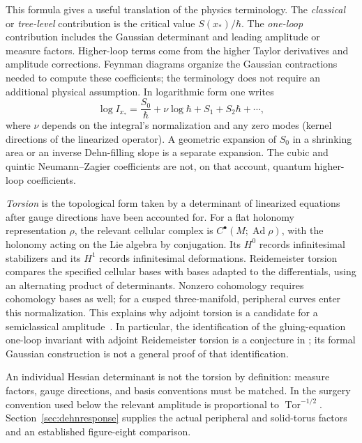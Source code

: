 This formula gives a useful translation of the physics terminology.
The \emph{classical} or \emph{tree-level} contribution is the
critical value $S(x_*)/\hbar$. The \emph{one-loop} contribution
includes the Gaussian determinant and leading amplitude or measure
factors. Higher-loop terms come from the higher Taylor derivatives
and amplitude corrections. Feynman diagrams organize the Gaussian
contractions needed to compute these coefficients; the terminology
does not require an additional physical assumption. In logarithmic
form one writes
\[
 \log I_{x_*}=\frac{S_0}{\hbar}
      +\nu\log\hbar+S_1+S_2\hbar+\cdots,
\]
where $\nu$ depends on the integral's normalization and any zero
modes (kernel directions of the linearized operator). A geometric expansion of $S_0$ in a shrinking area or an
inverse Dehn-filling slope is a separate expansion. The cubic and
quintic Neumann--Zagier coefficients are not, on that account,
quantum higher-loop coefficients.

\emph{Torsion} is the topological form taken by a determinant of
linearized equations after gauge directions have been accounted
for. For a flat holonomy representation $\rho$, the relevant
cellular complex is $C^\bullet(M;\operatorname{Ad}\rho)$, with the
holonomy acting on the Lie algebra by conjugation.
Its $H^0$ records infinitesimal stabilizers and its $H^1$ records
infinitesimal deformations. Reidemeister torsion compares the
specified cellular bases with bases adapted to the differentials,
using an alternating product of determinants. Nonzero cohomology
requires cohomology bases as well; for a cusped three-manifold,
peripheral curves enter this normalization. This explains why adjoint torsion is a candidate for a
semiclassical amplitude~\cite{WittenJones,DimofteGaroufalidis}.
In particular, the identification of the gluing-equation one-loop
invariant with adjoint Reidemeister torsion is a conjecture in
\cite[Conjecture~1.8]{DimofteGaroufalidis}; its formal Gaussian
construction is not a general proof of that identification.

An individual Hessian determinant is not the torsion by definition:
measure factors, gauge directions, and basis conventions must be
matched. In the surgery convention used below the relevant
amplitude is proportional to $\operatorname{Tor}^{-1/2}$.
Section~\ref{sec:dehnresponse} supplies the actual peripheral and
solid-torus factors and an established figure-eight comparison.


